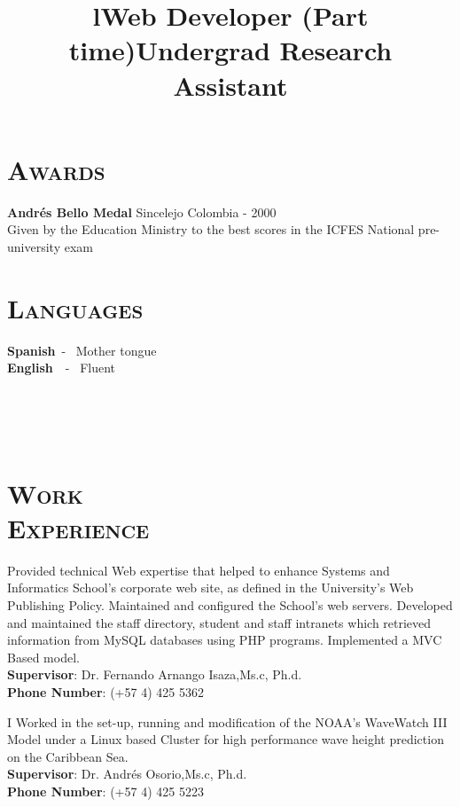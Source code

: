\begin{resume}
\section{\textsc{Awards}}
\textbf{Andr\'{e}s Bello Medal} \hfill  Sincelejo  Colombia - 2000 \\
Given by the Education Ministry to the best scores in the ICFES National pre-university exam \hfill \\

\section{\textsc{Languages}}
\textbf{Spanish}\   - \  Mother tongue \\
\textbf{English}\ \  - \ Fluent \\



\begin{formatb}
  \title{l}\\
 \\
  \body\\
\end{formatb}

\section{\textsc{Work\\ Experience}}

\title{\textbf{Web Developer} (Part time)}
\begin{position}
Provided technical Web expertise that helped to enhance Systems and Informatics School's corporate web site, 
as defined in the University's Web Publishing Policy. Maintained and configured the School's web servers. Developed and maintained the staff directory, student and staff intranets which retrieved information from MySQL databases using PHP programs. Implemented a MVC Based model.\\
\textbf{Supervisor}:  Dr. Fernando Arnango Isaza,Ms.c, Ph.d.\\
\textbf{Phone Number}: (+57 4) 425 5362 
\end{position}

\title{\textbf{Undergrad Research Assistant}}
\begin{position}
I Worked in the set-up, running and modification of the NOAA's WaveWatch III Model under a Linux based Cluster
for high performance wave height prediction on the Caribbean Sea.\\
\textbf{Supervisor}:  Dr. Andr\'{e}s Osorio,Ms.c, Ph.d.\\
\textbf{Phone Number}: (+57 4) 425 5223
\end{position}



\end{resume}
